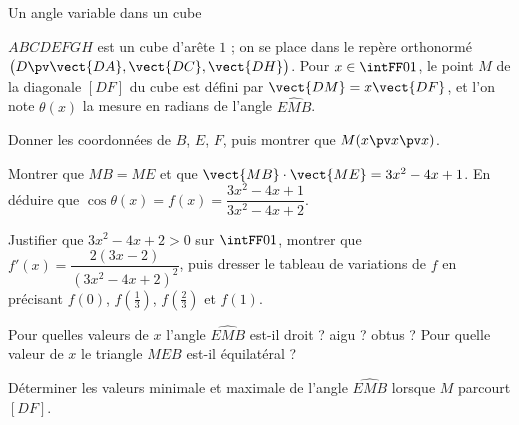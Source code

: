 \begin{exercice}[3]{Un angle variable dans un cube}
\begin{codecote}[0.6]
$ABCDEFGH$ est un cube d'arête $1$ ; on se place dans le repère orthonormé $\big(D\pv\vect{DA},\vect{DC},\vect{DH}\big)$. Pour
$x\in\intFF01$, le point $M$ de la diagonale $[DF]$ du cube est défini par $\vect{DM}=x\vect{DF}$, et l'on note $\theta(x)$ la mesure en
radians de l'angle $\widehat{EMB}$.
\begin{questions}
  \item Donner les coordonnées de $B$, $E$, $F$, puis montrer que $M(x\pv x\pv x)$.
  \item Montrer que $MB=ME$ et que $\vect{MB}\cdot\vect{ME}=3x^2-4x+1$. En déduire que
    $\cos\theta(x)=f(x)=\dfrac{3x^2-4x+1}{3x^2-4x+2}$.
\end{questions}
\cote
\centering
{}
\end{codecote}
\begin{questions}[start=3]
  \item Justifier que $3x^2-4x+2>0$ sur $\intFF01$, montrer que $f'(x)=\dfrac{2(3x-2)}{(3x^2-4x+2)^2}$, puis dresser le tableau de
    variations de $f$ en précisant $f(0)$, $f\left(\frac13\right)$, $f\left(\frac23\right)$ et $f(1)$.
  \item Pour quelles valeurs de $x$ l'angle $\widehat{EMB}$ est-il droit ? aigu ? obtus ? Pour quelle valeur de $x$ le triangle $MEB$
    est-il équilatéral ?
  \item Déterminer les valeurs minimale et maximale de l'angle $\widehat{EMB}$ lorsque $M$ parcourt $[DF]$.
\end{questions}
\end{exercice}

